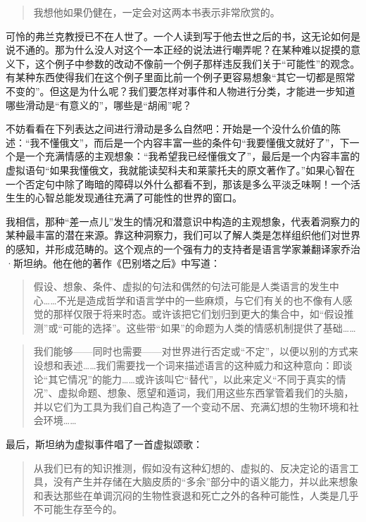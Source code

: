 \begin{quote}
我想他如果仍健在，一定会对这两本书表示非常欣赏的。
\end{quote}

可怜的弗兰克教授已不在人世了。一个人读到写于他去世之后的书，这无论如何是说不通的。那为什么没人对这个一本正经的说法进行嘲弄呢？在某种难以捉摸的意义下，这个例子中参数的改动不像前一个例子那样违反我们关于“可能性”的观念。有某种东西使得我们在这个例子里面比前一个例子更容易想象“其它一切都是照常不变的”。但这是为什么呢？我们要怎样对事件和人物进行分类，才能进一步知道哪些滑动是“有意义的”，哪些是“胡闹”呢？

不妨看看在下列表达之间进行滑动是多么自然吧：开始是一个没什么价值的陈述：“我不懂俄文”，而后是一个内容丰富一些的条件句“我要懂俄文就好了”，下一个是一个充满情感的主观想象：“我希望我已经懂俄文了”，最后是一个内容丰富的虚拟语句“如果我懂俄文，我就能读契科夫和莱蒙托夫的原文著作了。”如果心智在一个否定句中除了晦暗的障碍以外什么都看不到，那该是多么平淡乏味啊！一个活生生的心智总能发现通往充满了可能性的世界的窗口。

我相信，那种“差一点儿”发生的情况和潜意识中构造的主观想象，代表着洞察力的某种最丰富的潜在来源。靠这种洞察力，我们可以了解人类是怎样组织他们对世界的感知，并形成范畴的。这个观点的一个强有力的支持者是语言学家兼翻译家乔治·斯坦纳。他在他的著作《巴别塔之后》中写道：

\begin{quote}
假设、想象、条件、虚拟的句法和偶然的句法可能是人类语言的发生中心……\lnote{[它们]}不光是造成哲学和语言学中的一些麻烦，与它们有关的也不像有人感觉的那样仅限于将来时态。或许该把它们划归到更大的集合中，如“假设推测”或“可能的选择”。这些带“如果”的命题为人类的情感机制提供了基础……
\end{quote}

\begin{quote}
我们能够——同时也需要——对世界进行否定或“不定”，以便以别的方式来设想和表述……我们需要找一个词来描述语言的这种威力和这种意向：即谈论“其它情况”的能力……或许该叫它“替代”，以此来定义“不同于真实的情况”、虚拟命题、想象、愿望和遁词，我们用这些东西掌管着我们的头脑，并以它们为工具为我们自己构造了一个变动不居、充满幻想的生物环境和社会环境……
\end{quote}

最后，斯坦纳为虚拟事件唱了一首虚拟颂歌：

\begin{quote}
从我们已有的知识推测，假如没有这种幻想的、虚拟的、反决定论的语言工具，没有产生并存储在大脑皮质的“多余”部分中的语义能力，并以此来想象和表达那些在单调沉闷的生物性衰退和死亡之外的各种可能性，人类是几乎不可能生存至今的。
\end{quote}

